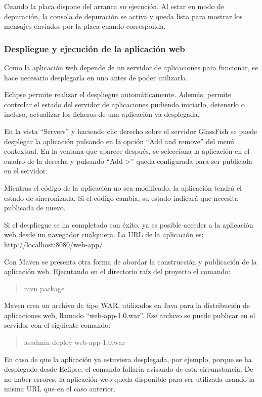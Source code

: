 
Cuando la placa dispone del \sw{} arranca su ejecución. Al estar en modo de
depuración, la consola de depuración se activa y queda lista para mostrar los
mensajes enviados por la placa cuando corresponda.



\subsubsection{Despliegue y ejecución de la aplicación web} \label{sec:exe-aw}
Como la aplicación web depende de un servidor de aplicaciones para funcionar,
se hace necesario desplegarla en uno antes de poder utilizarla.

Eclipse permite realizar el despliegue automáticamente. Además, permite
controlar el estado del servidor de aplicaciones pudiendo iniciarlo, detenerlo o
incluso, actualizar los ficheros de una aplicación ya desplegada.

En la vista ``Servers'' y haciendo clic derecho sobre el servidor GlassFish
se puede desplegar la aplicación pulsando en la opción ``Add and remove'' del
menú contextual. En la ventana que aparece después, se selecciona la aplicación
en el cuadro de la derecha y pulsando ``Add >'' queda configurada para ser
publicada en el servidor.


Mientras el código de la aplicación no sea modificado, la aplicación tendrá el
estado de sincronizada. Si el código cambia, su estado indicará que necesita
publicada de nuevo.


Si el despliegue se ha completado con éxito, ya es posible acceder a la
aplicación web desde un navegador cualquiera. La URL de la aplicación es:
http://localhost:8080/web-app/ .


Con Maven se presenta otra forma de abordar la construcción y publicación de la
aplicación web. Ejecutando en el directorio raíz del proyecto el comando:
\begin{quotation}
  mvn package
\end{quotation}
Maven crea un archivo de tipo WAR, utilizados en Java para la distribución de
aplicaciones web, llamado ``web-app-1.0.war''. Ese archivo se puede publicar
en el servidor con el siguiente comando:
\begin{quotation}
  asadmin deploy web-app-1.0.war
\end{quotation}
En caso de que la aplicación ya estuviera desplegada, por ejemplo, porque se ha
desplegado desde Eclipse, el comando fallaría avisando de esta circunstancia.
De no haber errores, la aplicación web queda disponible para ser utilizada
usando la misma URL que en el caso anterior. 



